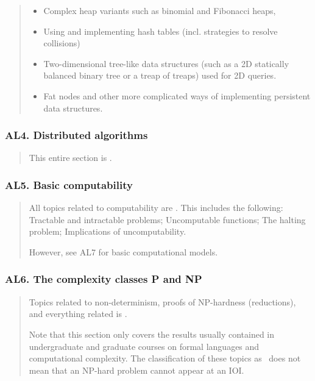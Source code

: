 \documentclass[a4paper,11pt,oneside]{article}
\newcommand{\xmark}{\ding{55}}%
\newcommand{\CC}[1]{#1}
\newcommand{\cnfoc}{{\small\faQuestion}}
\newcommand{\cexcl}{{\small\xmark}}
\newcommand{\Iexcluded}{\item[\hbox to 1.8em{\cexcl\hfill}]}
\newenvironment{myitemize}{\begin{quote}\begin{itemize}\itemsep 0pt}{\end{itemize}\end{quote}}
\begin{document}
    \begin{myitemize}
    \Iexcluded Complex heap variants such as binomial and Fibonacci heaps,
    \Iexcluded Using and implementing \CC{hash tables} (incl. strategies to resolve collisions)
    \Iexcluded Two-dimensional tree-like data structures (such as a 2D statically balanced binary tree or a treap of treaps) used for 2D queries.
    \Iexcluded Fat nodes and other more complicated ways of implementing persistent data structures.
    \end{myitemize}

    \subsubsection*{AL4. Distributed algorithms}%

    \begin{quote}
    This entire section is \cnfoc.
    \end{quote}

    \subsubsection*{AL5. Basic computability}%

    \begin{quote}
    All topics related to computability are \cexcl.
    This includes the following:
    \CC{Tractable and intractable problems};
    \CC{Uncomputable functions};
    \CC{The halting problem};
    \CC{Implications of uncomputability}.
    
    However, see AL7 for basic computational models.
    \end{quote}

    \subsubsection*{AL6. The complexity classes P and NP}%

    \begin{quote}
    Topics related to non-determinism, proofs of NP-hardness (reductions),
    and everything related is \cexcl.

    Note that this section only covers the results usually contained in
    undergraduate and graduate courses on formal languages and 
    computational complexity. The classification of these topics
    as \cexcl\ does not mean that an NP-hard 
    problem cannot appear at an IOI.
    \end{quote}
\end{document}
